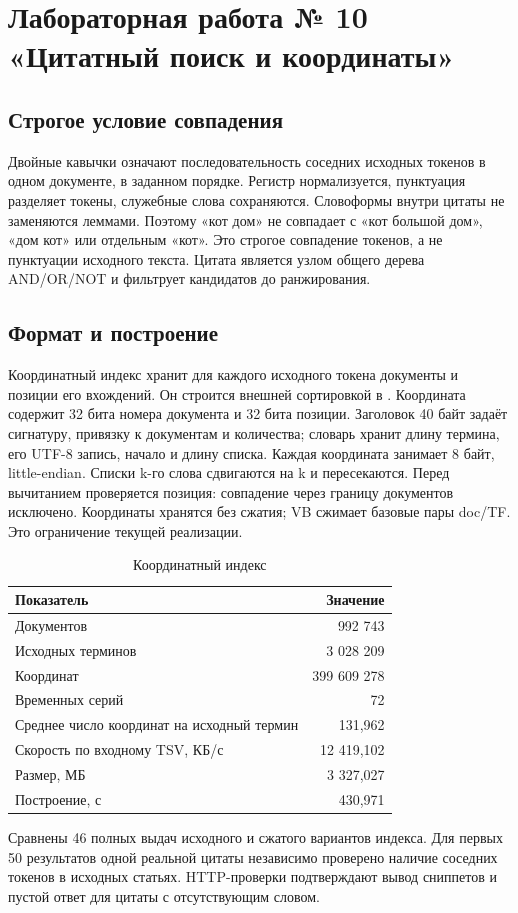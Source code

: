 \documentclass[12pt,a4paper]{article}
\newcommand{\code}[1]{\texttt{\detokenize{#1}}}
\newcommand{\sub}[1]{\subsection{#1}}
\begin{document}
\section{Лабораторная работа № 10\\«Цитатный поиск и координаты»}
\sub{Строгое условие совпадения}
Двойные кавычки означают последовательность соседних исходных токенов в одном документе,
в заданном порядке. Регистр нормализуется, пунктуация разделяет токены, служебные слова сохраняются.
Словоформы внутри цитаты не заменяются леммами. Поэтому «кот дом» не совпадает с «кот большой дом»,
«дом кот» или отдельным «кот». Это строгое совпадение токенов, а не пунктуации исходного текста.
Цитата является узлом общего дерева AND/OR/NOT и фильтрует кандидатов до ранжирования.
\sub{Формат и построение}
Координатный индекс хранит для каждого исходного токена документы и позиции его вхождений.
Он строится внешней сортировкой в \code{positions.ir}.
Координата содержит 32 бита номера документа и 32 бита позиции. Заголовок 40 байт задаёт сигнатуру,
привязку к документам и количества; словарь хранит длину термина, его UTF-8 запись, начало и длину списка.
Каждая координата занимает 8 байт, little-endian. Списки k-го слова сдвигаются на k и пересекаются.
Перед вычитанием проверяется позиция: совпадение через границу документов исключено.
Координаты хранятся без сжатия; VB сжимает базовые пары doc/TF. Это ограничение текущей реализации.
\begin{table}[H]\centering\small
\caption{Координатный индекс}
\begin{tabularx}{\linewidth}{|X|r|}\hline
Показатель & Значение \\\hline
Документов & 992 743 \\\hline
Исходных терминов & 3 028 209 \\\hline
Координат & 399 609 278 \\\hline
Временных серий & 72 \\\hline
Среднее число координат на исходный термин & 131,962 \\\hline
Скорость по входному TSV, КБ/с & 12 419,102 \\\hline
Размер, МБ & 3 327,027 \\\hline
Построение, с & 430,971 \\\hline
\end{tabularx}\end{table}
Сравнены 46 полных выдач исходного и сжатого вариантов индекса. Для первых 50 результатов одной реальной цитаты независимо проверено наличие соседних токенов в исходных статьях. HTTP-проверки подтверждают вывод сниппетов и пустой ответ для цитаты с отсутствующим словом.
\end{document}
